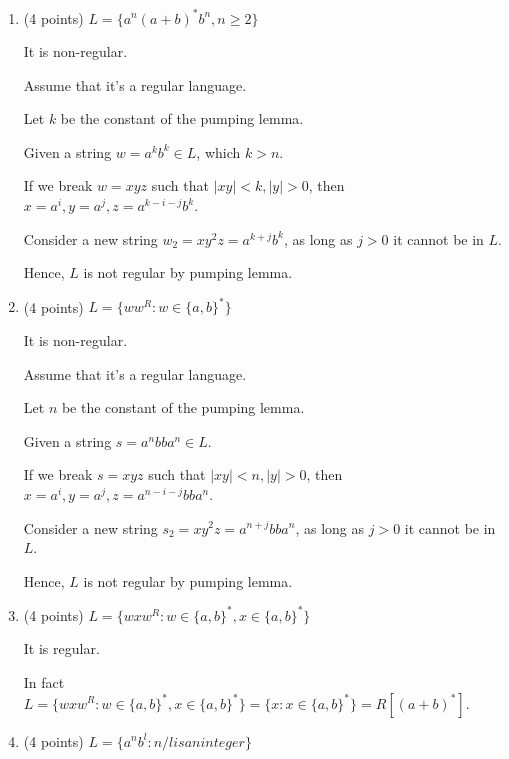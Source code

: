 \documentclass[paper=a4, fontsize=11pt]{scrartcl} %
\begin{document}
\begin{enumerate}
\item
  \begin{fancyquotes}
    (4 points) $L = \{a^n(a+b)^*b^n, n\geq 2\}$
  \end{fancyquotes}

  It is non-regular.

  Assume that it's a regular language.

  Let $k$ be the constant of the pumping lemma.

  Given a string $w = a^kb^k \in L$, which $k>n$.

  If we break $w = xyz$ such that $|xy|<k, |y|>0$, then
  $x = a^i, y = a^j, z = a^{k-i-j}b^k$.

  Consider a new string $w_2 = xy^2z = a^{k+j}b^k$,
  as long as $j>0$ it cannot be in $L$.

  Hence, $L$ is not regular by pumping lemma.

\item
  \begin{fancyquotes}
    (4 points) $L = \{ww^R : w\in\{a,b\}^*\}$
  \end{fancyquotes}

  It is non-regular.

  Assume that it's a regular language.

  Let $n$ be the constant of the pumping lemma.

  Given a string $s = a^nbba^n \in L$.

  If we break $s = xyz$ such that $|xy|<n, |y|>0$, then
  $x = a^i, y = a^j, z = a^{n-i-j}bba^n$.

  Consider a new string $s_2 = xy^2z = a^{n+j}bba^n$,
  as long as $j>0$ it cannot be in $L$.

  Hence, $L$ is not regular by pumping lemma.

\item
  \begin{fancyquotes}
    (4 points) $L = \{wxw^R : w\in\{a,b\}^*, x\in\{a,b\}^*\}$
  \end{fancyquotes}


  It is regular.

  In fact $L = \{wxw^R : w\in\{a,b\}^*, x\in\{a,b\}^*\} = \{x :
  x\in\{a,b\}^*\} = R[(a+b)^*]$.

\item
  \begin{fancyquotes}
    (4 points) $L = \{a^{n}b^l : n/l is an integer\}$
  \end{fancyquotes}


\end{enumerate}
\end{document}
